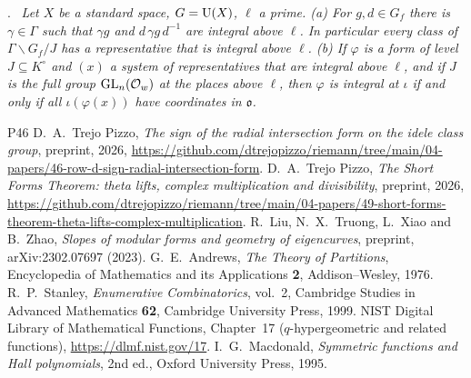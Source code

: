 \documentclass[10pt]{amsart}
\theoremstyle{definition}
\theoremstyle{remark}
\providecommand{\auGL}{\mathrm{GL}}
\providecommand{\pao}{\mathfrak o}
\newenvironment{quotedthm}[2]{\par\medskip\noindent\begingroup
  \textbf{#1}#2.\ \itshape\ignorespaces}{\endgroup\par\medskip}
\begin{document}
\begin{quotedthm}{\cite[Corollary~6.4]{P49}}{}
Let $X$ be a standard space, $G=\mathrm U(X)$, $\ell$ a prime.
{\rm(a)} For $g,d\in G_f$ there is $\gamma\in\Gamma$ such that $\gamma g$ and $d\,\gamma g\,d^{-1}$
are integral above $\ell$. In particular every class of $\Gamma\backslash G_f/J$ has a
representative that is integral above $\ell$.
{\rm(b)} If $\varphi$ is a form of level $J\subseteq K^\circ$ and $(x)$ a system of representatives
that are integral above $\ell$, and if $J$ is the full group $\auGL_n(\auO_w)$ at the places above
$\ell$, then $\varphi$ is integral at $\iota$ if and only if all $\iota(\varphi(x))$ have
coordinates in $\pao$.
\end{quotedthm}

\begin{thebibliography}{P46}
 D.~A.~Trejo Pizzo, \emph{The sign of the radial intersection form on the idele class group}, preprint, 2026, \url{https://github.com/dtrejopizzo/riemann/tree/main/04-papers/46-row-d-sign-radial-intersection-form}.
 D.~A.~Trejo Pizzo, \emph{The Short Forms Theorem: theta lifts, complex multiplication and divisibility}, preprint, 2026, \url{https://github.com/dtrejopizzo/riemann/tree/main/04-papers/49-short-forms-theorem-theta-lifts-complex-multiplication}.
 R.~Liu, N.~X.~Truong, L.~Xiao and B.~Zhao, \emph{Slopes of modular forms and
geometry of eigencurves}, preprint, arXiv:2302.07697 (2023).
 G.~E.~Andrews, \emph{The Theory of Partitions}, Encyclopedia of
Mathematics and its Applications \textbf{2}, Addison--Wesley, 1976.
 R.~P.~Stanley, \emph{Enumerative Combinatorics}, vol.~2, Cambridge Studies in
Advanced Mathematics \textbf{62}, Cambridge University Press, 1999.
 NIST Digital Library of Mathematical Functions, Chapter~17 ($q$-hypergeometric
and related functions), \url{https://dlmf.nist.gov/17}.
 I.~G.~Macdonald, \emph{Symmetric functions and Hall polynomials}, 2nd ed.,
Oxford University Press, 1995.
\end{thebibliography}
\end{document}
